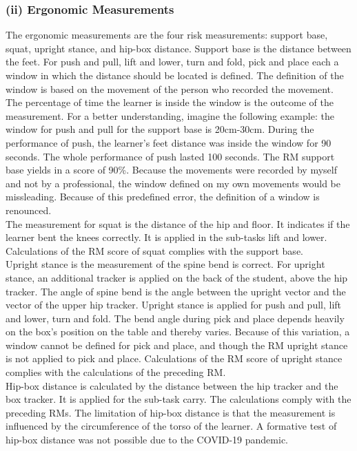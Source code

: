\subsubsection{(ii) Ergonomic Measurements}
The ergonomic measurements are the four risk measurements: support base, squat, upright stance, and hip-box distance. Support base is the distance between the feet. For push and pull, lift and lower, turn and fold, pick and place each a window in which the distance should be located is defined. The definition of the window is based on the movement of the person who recorded the movement. The percentage of time the learner is inside the window is the outcome of the measurement. For a better understanding, imagine the following example: the window for push and pull for the support base is 20cm-30cm. During the performance of push, the learner's feet distance was inside the window for 90 seconds. The whole performance of push lasted 100 seconds. The RM support base yields in a score of 90\%. Because the movements were recorded by myself and not by a professional, the window defined on my own movements would be missleading. Because of this predefined error, the definition of a window is renounced.\\
The measurement for squat is the distance of the hip and floor. It indicates if the learner bent the knees correctly. It is applied in the sub-tasks lift and lower. Calculations of the RM score of squat complies with the support base.\\
Upright stance is the measurement of the spine bend is correct. For upright stance, an additional tracker is applied on the back of the student, above the hip tracker. The angle of spine bend is the angle between the upright vector and the vector of the upper hip tracker. Upright stance is applied for push and pull, lift and lower, turn and fold. The bend angle during pick and place depends heavily on the box's position on the table and thereby varies. Because of this variation, a window cannot be defined for pick and place, and though the RM upright stance is not applied to pick and place. Calculations of the RM score of upright stance complies with the calculations of the preceding RM.\\
Hip-box distance is calculated by the distance between the hip tracker and the box tracker. It is applied for the sub-task carry. The calculations comply with the preceding RMs. The limitation of hip-box distance is that the measurement is influenced by the circumference of the torso of the learner. A formative test of hip-box distance was not possible due to the COVID-19 pandemic.

